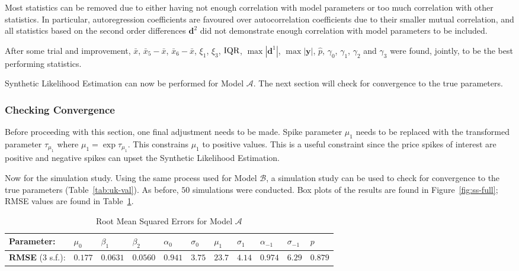 Most statistics can be removed due to either having not enough correlation with model parameters or too much correlation with other statistics. In particular, autoregression coefficients are favoured over autocorrelation coefficients due to their smaller mutual correlation, and all statistics based on the second order differences $\pmb{d}^2$ did not demonstrate enough correlation with model parameters to be included.

After some trial and improvement, $\bar{x}$, $\bar{x}_5 - \bar{x}$, $\bar{x}_6 - \bar{x}$, $\xi_1$, $\xi_3$, $\mathop{}\!\text{IQR}{}$, $\max{|\pmb{d}^1|}$, $\max{|\pmb{y}|}$, $\hat{p}$, $\gamma_0$, $\gamma_1$, $\gamma_2$ and $\gamma_3$ were found, jointly, to be the best performing statistics.

Synthetic Likelihood Estimation can now be performed for Model $\mathcal{A}$. The next section will check for convergence to the true parameters.

\subsubsection{Checking Convergence}

Before proceeding with this section, one final adjustment needs to be made. Spike parameter $\mu_1$ needs to be replaced with the transformed parameter $\tau_{\mu_1}$ where $\mu_1 = \exp{\tau_{\mu_1}}$. This constrains $\mu_1$ to positive values. This is a useful constraint since the price spikes of interest are positive and negative spikes can upset the Synthetic Likelihood Estimation.

Now for the simulation study. Using the same process used for Model $\mathcal{B}$, a simulation study can be used to check for convergence to the true parameters (Table~\ref{tab:uk-val}). As before, $50$ simulations were conducted. Box plots of the results are found in Figure~\ref{fig:ss-full}; RMSE values are found in Table~\ref{tab:rmse-full}.

\begin{table}[H]
\caption{Root Mean Squared Errors for Model $\mathcal{A}$}
\label{tab:rmse-full}
\begin{tabular}{@{}lllllllllll@{}}
\toprule
\textbf{Parameter}: & $\mu_0$ & $\beta_1$ & $\beta_2$ & $\alpha_0$ & $\sigma_0$ & $\mu_1$ & $\sigma_1$ & $\alpha_{-1}$ & $\sigma_{-1}$ & $p$  \\
\midrule
\textbf{RMSE} ($3$ s.f.): & $0.177$   & $0.0631$    & $0.0560$    & $0.941$      & $3.75$      & $23.7$   & $4.14$      & $0.974$         & $6.29$         & $0.879$ \\
\bottomrule
\end{tabular}
\end{table}

